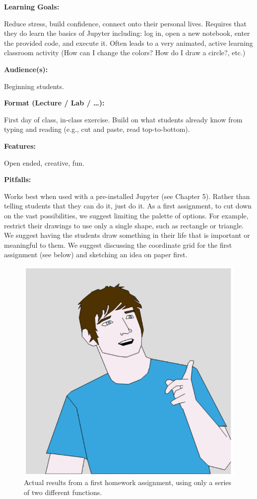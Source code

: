 \documentclass[]{book}
\begin{document}
\textbf{Learning Goals:}

Reduce stress, build confidence, connect onto their personal lives.
Requires that they do learn the basics of Jupyter including: log in,
open a new notebook, enter the provided code, and execute it. Often
leads to a very animated, active learning classroom activity (How can I
change the colors? How do I draw a circle?, etc.)

\textbf{Audience(s):}

Beginning students.

\textbf{Format (Lecture / Lab / \ldots{}):}

First day of class, in-class exercise. Build on what students already
know from typing and reading (e.g., cut and paste, read top-to-bottom).

\textbf{Features:}

Open ended, creative, fun.

\textbf{Pitfalls:}

Works best when used with a pre-installed Jupyter (see Chapter 5).
Rather than telling students that they can do it, just do it. As a first
assignment, to cut down on the vast possibilities, we suggest limiting
the palette of options. For example, restrict their drawings to use only
a single shape, such as rectangle or triangle. We suggest having the
students draw something in their life that is important or meaningful to
them. We suggest discussing the coordinate grid for the first assignment
(see below) and sketching an idea on paper first.

\begin{figure}
\centering
\includegraphics{images/ebrose.png}
\caption{Actual results from a first homework assignment, using only a
series of two different functions.}
\end{figure}
\end{document}
